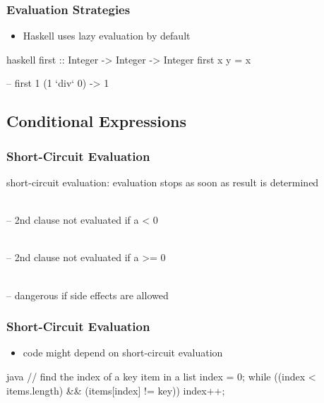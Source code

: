 \documentclass[dvipsnames]{beamer}
\theoremstyle{plain}
\begin{document}
\begin{frame}[fragile]
  \frametitle{Evaluation Strategies}

  \begin{itemize}
    \item Haskell uses lazy evaluation by default
  \end{itemize}

  \begin{example}[Haskell]
    \begin{pygments}{haskell}
first :: Integer -> Integer -> Integer
first x y = x

-- first 1 (1 `div` 0) -> 1
    \end{pygments}
  \end{example}
\end{frame}

\subsection{Conditional Expressions}

\begin{frame}
  \frametitle{Short-Circuit Evaluation}

  \begin{definition}
    \alert{short-circuit evaluation}: evaluation stops
      as soon as result is determined
  \end{definition}

  \pause
  \begin{example}
    \\
    -- 2nd clause not evaluated if a < 0

    \bigskip
    \\
    -- 2nd clause not evaluated if a >= 0

    \pause
    \bigskip
    \\
    -- dangerous if side effects are allowed
  \end{example}
\end{frame}

\begin{frame}[fragile]
  \frametitle{Short-Circuit Evaluation}

  \begin{itemize}
    \item code might depend on short-circuit evaluation
  \end{itemize}

  \begin{example}[Java]
    \begin{pygments}{java}
// find the index of a key item in a list
index = 0;
while ((index < items.length) && (items[index] != key))
    index++;
    \end{pygments}
  \end{example}
\end{frame}
\end{document}
